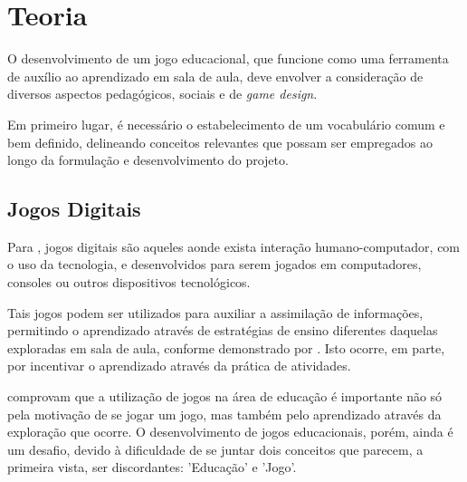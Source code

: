
\chapter{Teoria}\label{cap-teoria}

O desenvolvimento de um jogo educacional, que funcione como uma ferramenta de auxílio ao
aprendizado em sala de aula, deve envolver a consideração de diversos aspectos
pedagógicos, sociais e de \textit{game design}.

Em primeiro lugar, é necessário o estabelecimento de um vocabulário comum e bem
definido, delineando conceitos relevantes que possam ser empregados ao longo da 
formulação e desenvolvimento do projeto.

\section{Jogos Digitais}\label{sec-jogosdigitais}


Para \cite{correia:2009:digital_games_spore}, jogos digitais são aqueles aonde exista
interação humano-computador, com o uso da tecnologia, e desenvolvidos para serem 
jogados em computadores, consoles ou outros dispositivos tecnológicos.

Tais jogos podem ser utilizados para auxiliar a assimilação de informações, permitindo
o aprendizado através de estratégias de ensino diferentes daquelas exploradas em sala
de aula, conforme demonstrado por \cite{fernandes:2012:digital_education}. Isto 
ocorre, em parte, por incentivar o aprendizado através da prática de atividades.

\cite{correia:2009:digital_games_spore} comprovam que a utilização de jogos 
na área de educação é importante não só pela motivação de se jogar um jogo, 
mas também pelo aprendizado através da exploração que ocorre. O 
desenvolvimento de jogos educacionais, porém, ainda é um desafio, devido 
à dificuldade de se juntar dois conceitos que parecem, a primeira vista,
ser discordantes: 'Educação' e 'Jogo'.


